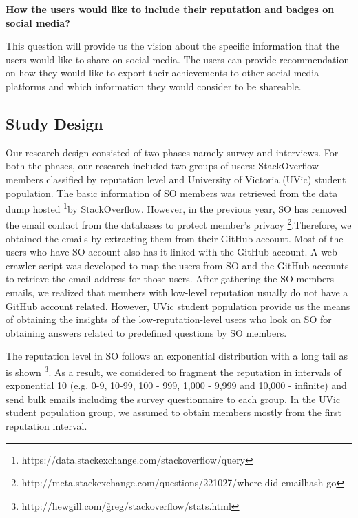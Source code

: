 \documentclass{sigchi}
\begin{document}
\textbf{How the users would like to include their reputation and badges
on social media?}

This question will provide us the vision about the specific information that the users would like to share on social media. The users can provide recommendation on how they would like to export their achievements to other social media platforms and which information they would consider to be shareable.

\bigskip

\subsection{Study Design}
Our research design consisted of two phases namely survey and interviews. For both the phases, our research included two groups of users: StackOverflow members classified by reputation level and University of Victoria (UVic) student population. The basic information of SO members was retrieved from the data dump hosted \footnote{https://data.stackexchange.com/stackoverflow/query}by StackOverflow. However, in the previous year, SO has removed the email contact from the databases to protect member's privacy \footnote{http://meta.stackexchange.com/questions/221027/where-did-emailhash-go}.Therefore, we obtained the emails by extracting them from their GitHub account. Most of the users who have SO account also has it linked with the GitHub account. A web crawler script was developed to map the users from SO and the GitHub accounts to retrieve the email address for those users. After gathering the SO members emails, we realized that members with low-level reputation usually do not have a GitHub account related. However, UVic student population provide us the means of obtaining the insights of the low-reputation-level users who look on SO for obtaining answers related to predefined questions by SO members. 

The reputation level in SO follows an exponential distribution with a long tail as is shown \footnote{http://hewgill.com/\~greg/stackoverflow/stats.html}. As a result, we considered to fragment the reputation in intervals of exponential 10 (e.g. 0-9, 10-99, 100 - 999, 1,000 - 9,999 and 10,000 - infinite) and send bulk emails including the survey questionnaire to each group. In the UVic student population group, we assumed to obtain members mostly from the first reputation interval. 
\end{document}
